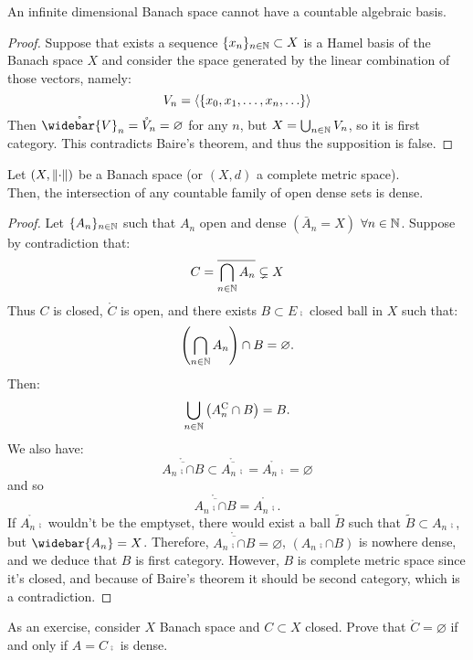 \begin{coro}
	An infinite dimensional Banach space cannot have a countable algebraic basis.
\end{coro}
\begin{proof}
	Suppose that exists a sequence $\{x_n\}_{n\in\mathbb N}\subset X$ is a Hamel basis of the Banach space $X$ and consider the space generated by the linear combination of those vectors, namely:
	$$V_n = \left\langle\{x_0,x_1,\ldots,x_n,\ldots\}\right\rangle$$
	Then $\mathring{\widebar{V}}_n=\mathring{V}_n=\varnothing$ for any $n$, but $X=\bigcup_{n\in\mathbb N}V_n$, so it is first category. This contradicts Baire's theorem, and thus the supposition is false.
\end{proof}

\begin{coro} \label{coro-inters-dense}
	Let $(X,\left\lVert\cdot\right\rVert)$ be a Banach space (or $(X,d)$ a complete metric space).\\
	Then, the intersection of any countable family of open dense sets is dense.
\end{coro}
\begin{proof}
	Let $\{A_n\}_{n \in \mathbb N}$ such that $A_n$ open and dense $({\bar A}_n=X)$ $\forall n \in \mathbb N$. Suppose by contradiction that:
	$$C=\overline{\bigcap_{n\in\mathbb N}A_n} \subsetneq X$$
	Thus $C$ is closed, $\mathring{C}$ is open, and there exists $B \subset E\comp$ closed ball in $X$ such that:
	$$\left(\bigcap_{n\in \mathbb N}A_n\right) \cap B = \varnothing.$$
	Then:
	$$
	\bigcup_{n \in \mathbb N}\left(A_n^{\mathrm{C}} \cap B\right)= B.
	$$
	We also have:
	$$\mathring{\overline{A_n\comp \cap B}} \subset \mathring{\overline{A_n\comp}}= \mathring{A_n\comp} = \varnothing$$
	and so
	$$
	\mathring{\overline{A_n\comp \cap B}} = \mathring{A_n\comp}.$$
	If $\mathring{A_n\comp}$ wouldn't be the emptyset, there would exist a ball $\tilde B$ such that $\tilde B \subset A_n\comp$, but $\widebar{A_n}=X$.
	Therefore, $\mathring{\overline{A_n\comp \cap B}} = \varnothing$, $(A_n\comp \cap B)$ is nowhere dense, and we deduce that $B$ is first category.
	However, $B$ is complete metric space since it's closed, and because of Baire's theorem it should be second category, which is a contradiction.
\end{proof}

As an exercise, consider $X$ Banach space and $C\subset X$ closed. Prove that $\mathring C = \varnothing$ if and only if $A=C\comp$ is dense.
